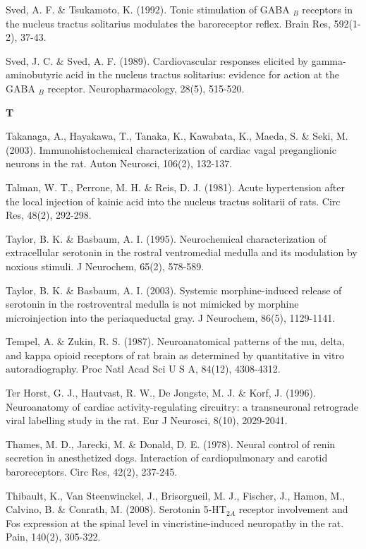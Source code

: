 \documentclass[a4paper,12pt,twoside]{report}
\begin{document}
\begin{singlespacing}
\begin{footnotesize}
Sved, A. F. \& Tsukamoto, K. (1992). Tonic stimulation of GABA $_{B}$ receptors in the nucleus tractus solitarius modulates the baroreceptor reflex. Brain Res, 592(1-2), 37-43.

Sved, J. C. \& Sved, A. F. (1989). Cardiovascular responses elicited by gamma-aminobutyric acid in the nucleus tractus solitarius: evidence for action at the GABA $_{B}$ receptor. Neuropharmacology, 28(5), 515-520.

\medskip
\begin{Large}\textbf{T}\end{Large}

Takanaga, A., Hayakawa, T., Tanaka, K., Kawabata, K., Maeda, S. \& Seki, M. (2003). Immunohistochemical characterization of cardiac vagal preganglionic neurons in the rat. Auton Neurosci, 106(2), 132-137.

Talman, W. T., Perrone, M. H. \& Reis, D. J. (1981). Acute hypertension after the local injection of kainic acid into the nucleus tractus solitarii of rats. Circ Res, 48(2), 292-298.

Taylor, B. K. \& Basbaum, A. I. (1995). Neurochemical characterization of extracellular serotonin in the rostral ventromedial medulla and its modulation by noxious stimuli. J Neurochem, 65(2), 578-589.

Taylor, B. K. \& Basbaum, A. I. (2003). Systemic morphine-induced release of serotonin in the rostroventral medulla is not mimicked by morphine microinjection into the periaqueductal gray. J Neurochem, 86(5), 1129-1141.

Tempel, A. \& Zukin, R. S. (1987). Neuroanatomical patterns of the mu, delta, and kappa opioid receptors of rat brain as determined by quantitative in vitro autoradiography. Proc Natl Acad Sci U S A, 84(12), 4308-4312.

Ter Horst, G. J., Hautvast, R. W., De Jongste, M. J. \& Korf, J. (1996). Neuroanatomy of cardiac activity-regulating circuitry: a transneuronal retrograde viral labelling study in the rat. Eur J Neurosci, 8(10), 2029-2041.

Thames, M. D., Jarecki, M. \& Donald, D. E. (1978). Neural control of renin secretion in anesthetized dogs. Interaction of cardiopulmonary and carotid baroreceptors. Circ Res, 42(2), 237-245.

Thibault, K., Van Steenwinckel, J., Brisorgueil, M. J., Fischer, J., Hamon, M., Calvino, B. \& Conrath, M. (2008). Serotonin 5-HT$_{2A}$ receptor involvement and Fos expression at the spinal level in vincristine-induced neuropathy in the rat. Pain, 140(2), 305-322.


\end{footnotesize}
\end{singlespacing}
\end{document}
